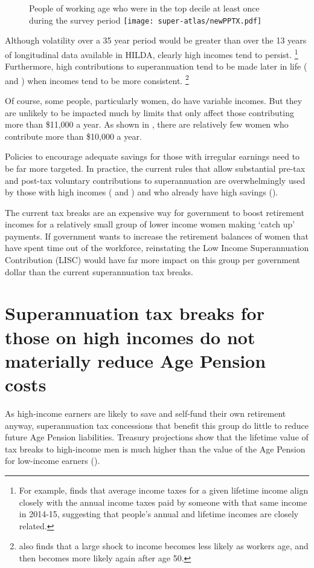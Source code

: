 \begin{figure}
%
{People of working age who were in the top decile at least once during the \textcite{HILDA2015} survey period}\label{fig:SUPER-3-8}
\texttt{[image: super-atlas/newPPTX.pdf]}
\end{figure}

Although volatility over a 35 year period would be greater than over the 13 years of longitudinal data available in HILDA, clearly high incomes tend to persist.%
\footnote{For example, \textcite[][96]{ProductivityCommission2015-Tax-and-transfer-incidence}  finds that average income taxes for a given lifetime income align closely with the annual income taxes paid by someone with that same income in 2014-15, suggesting that people’s annual and lifetime incomes are closely related.}
Furthermore, high contributions to superannuation tend to be made later in life ( and ) when incomes tend to be more consistent.%
\footnote{\textcite{Karahan2015} also finds that a large shock to income becomes less likely as workers age, and then becomes more likely again after age 50.} 

Of course, some people, particularly women, do have variable incomes. But they are unlikely to be impacted much by limits that only affect those contributing more than \$11,000 a year. As shown in , there are relatively few women who contribute more than \$10,000 a year. 

Policies to encourage adequate savings for those with irregular earnings need to be far more targeted. In practice, the current rules that allow substantial pre-tax and post-tax voluntary contributions to superannuation are overwhelmingly used by those with high incomes ( and ) and who already have high savings (). 

The current tax breaks are an expensive way for government to boost retirement incomes for a relatively small group of lower income women making ‘catch up’ payments. If government wants to increase the retirement balances of women that have spent time out of the workforce, reinstating the Low Income Superannuation Contribution (LISC) would have far more impact on this group per government dollar than the current superannuation tax breaks. 

\section{Superannuation tax breaks for those on high incomes do not materially reduce Age Pension costs}\label{sec:SUPER-3-5}
As high-income earners are likely to save and self-fund their own retirement anyway, superannuation tax concessions that benefit this group do little to reduce future Age Pension liabilities. Treasury projections show that the lifetime value of tax breaks to high-income men is much higher than the value of the Age Pension for low-income earners (). 

